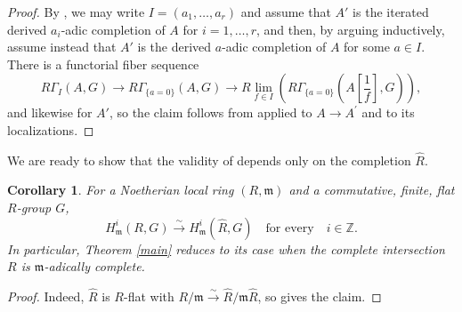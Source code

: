 \documentclass[11pt, reqno]{amsart}
\newcommand{\bZ}{\mathbb{Z}}
\newcommand{\fm}{\mathfrak{m}}
\newcommand{\ce}{\colonequals}
\newcommand{\isomto}{\overset{\sim}{\longrightarrow}}
\providecommand{\p}[1]{\left(#1\right)}
\newcommand{\wh}{\widehat}
\providecommand{\uref}[1]{{\upshape\ref{#1}}}
\providecommand{\f}[2]{\frac{#1}{#2}}
\newcommand{\x}{\text}
\providecommand{\qxq}[1]{\quad\text{#1}\quad}
\newcommand{\q}{\quad}
\newcommand{\tst}{\textstyle}
\newcommand{\bpf}{\begin{proof}}
\newcommand{\epf}{\end{proof}}
\newcommand{\bcor}{\begin{cor}}
\newcommand{\ecor}{\end{cor}}
\numberwithin{equation}{numberingbase}
\theoremstyle{thms}
\newtheorem{cor}[numberingbase]{Corollary}
\theoremstyle{claims}
\theoremstyle{defs}
\theoremstyle{thms}
\theoremstyle{defs}
\theoremstyle{subsection-tweak}
\theoremstyle{subsection-tweak}
\begin{document}
\begin{proof} 
By , we may write $I = (a_1, \dotsc, a_r)$ and assume that $A'$ is the iterated derived $a_i$-adic completion of $A$ for $i = 1, \dotsc, r$, %
and then, by arguing inductively, assume instead that $A'$ is the derived $a$-adic completion of $A$ for some $a \in I$. 
There is a functorial fiber sequence
\[
\tst R\Gamma_I(A,G)\to R\Gamma_{\{a = 0\}}(A,G)\to R\lim_{f \in I} \p{R\Gamma_{\{a = 0\}}(A[\f 1f], G)}, 
\]
and likewise for $A'$, so the claim follows from  applied to $A\to A^\prime$ and to its localizations.
\end{proof}



We are ready to show that the validity of  depends only on the completion $\wh{R}$. 

\bcor \label{reduce-to-complete}
For a Noetherian local ring $(R, \fm)$ and a commutative, finite, flat $R$-group $G$,
\[
H^i_\fm(R, G) \isomto H^i_{\fm}(\wh{R}, G) \qxq{for every} i \in \bZ.
\]
In particular, Theorem \uref{main} reduces to its case when the complete intersection $R$ is $\fm$-adically complete.
\ecor

\bpf
Indeed, $\wh{R}$ is $R$-flat with $R/\fm \isomto \wh{R}/\fm \wh{R}$, 
so  gives the claim.
\epf
\end{document}
